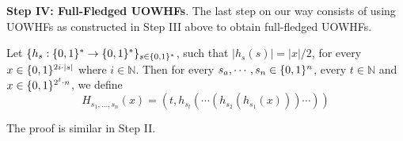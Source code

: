 \noindent\textbf{Step IV: Full-Fledged UOWHFs}. 
The last step on our way consists of using UOWHFs as constructed in Step III above to obtain
full-fledged UOWHFs.
\begin{construction}[(a UOWHF)]
Let $\{h_s:\{0,1\}^{*}\rightarrow\{0,1\}^{*}\}_{s\in\{0,1\}^{*}}$, such that $|h_s(s)|=|x|/2$, for every $x\in\{0,1\}^{2i\cdot|s|}$ where $i\in\mathbb{N}$. Then for every $s_a,\cdots,s_n\in\{0,1\}^{n}$, every $t\in\mathbb{N}$ and $x\in\{0,1\}^{2^t\cdot n}$, we define
\[
    H_{s_1,\dots,s_n}(x)=(t,h_{s_t}(\cdots(h_{s_2}(h_{s_1}(x)))\cdots))
\]
\end{construction}
The proof is similar in Step II. 
